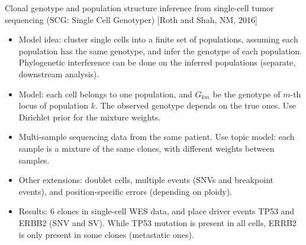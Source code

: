 \documentclass{report}
\begin{document}
Clonal genotype and population structure inference from single-cell tumor sequencing (SCG: Single Cell Genotyper) [Roth and Shah, NM, 2016]
\begin{itemize}
	\item Model idea: cluster single cells into a finite set of populations, assuming each population has the same genotype, and infer the genotype of each population. Phylogenetic interference can be done on the inferred populations (separate, downstream analysis). 
	
	\item Model: each cell belongs to one population, and $G_{km}$ be the genotype of $m$-th locus of population $k$. The observed genotype depends on the true ones. Use Dirichlet prior for the mixture weights.  
	
	\item Multi-sample sequencing data from the same patient. Use topic model: each sample is a mixture of the same clones, with different weights between samples. 
	
	\item Other extensions: doublet cells, multiple events (SNVs and breakpoint events), and position-specific errors (depending on ploidy).  
	
	\item Results: 6 clones in single-cell WES data, and place driver events TP53 and ERBB2 (SNV and SV). While TP53 mutation is present in all cells, ERRB2 is only present in some clones (metastatic ones). 
\end{itemize}
\end{document}
